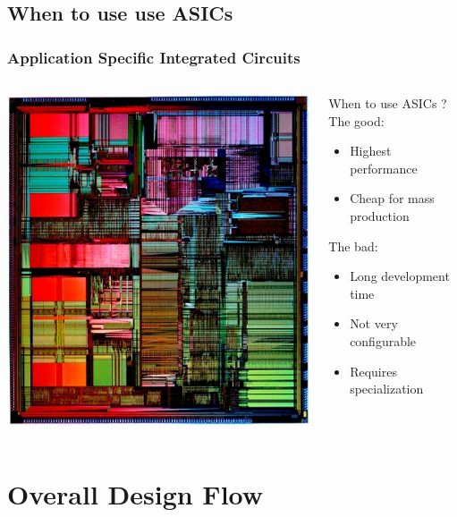 \documentclass[compress]{beamer}
\begin{document}
\subsection[ASICs]{When to use use ASICs}
	\begin{frame}
		\frametitle{Application Specific Integrated Circuits}
				
\begin{columns}	
	\begin{center}
		\includegraphics[width=0.7 \textwidth]{ASICs}
	\end{center}
	\column{0.53\textheight}
	\begin{block}{When to use ASICs ?}
		The good:
		\begin{itemize}
			\item Highest performance
			\item Cheap for mass production
		\end{itemize}
		The bad:	
		\begin{itemize}
			\item Long development time
			\item Not very configurable
			\item Requires specialization
		\end{itemize}
	\end{block}	
\end{columns}
	\end{frame}
\section[Flow]{Overall Design Flow}
\end{document}
